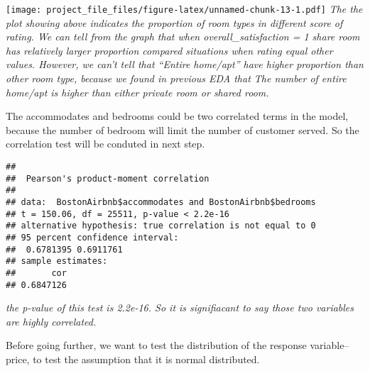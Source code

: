 \documentclass[]{article}
\newenvironment{Shaded}{\begin{snugshade}}{\end{snugshade}}
\newcommand{\KeywordTok}[1]{\textcolor[rgb]{0.13,0.29,0.53}{\textbf{#1}}}
\newcommand{\DataTypeTok}[1]{\textcolor[rgb]{0.13,0.29,0.53}{#1}}
\newcommand{\DecValTok}[1]{\textcolor[rgb]{0.00,0.00,0.81}{#1}}
\newcommand{\StringTok}[1]{\textcolor[rgb]{0.31,0.60,0.02}{#1}}
\newcommand{\CommentTok}[1]{\textcolor[rgb]{0.56,0.35,0.01}{\textit{#1}}}
\newcommand{\OperatorTok}[1]{\textcolor[rgb]{0.81,0.36,0.00}{\textbf{#1}}}
\newcommand{\NormalTok}[1]{#1}
\begin{document}
\texttt{[image: project\_file\_files/figure-latex/unnamed-chunk-13-1.pdf]}
\emph{The the plot showing above indicates the proportion of room types
in different score of rating. We can tell from the graph that when
overall\_satisfaction = 1 share room has relatively larger proportion
compared situations when rating equal other values. However, we can't
tell that ``Entire home/apt'' have higher proportion than other room
type, because we found in previous EDA that The number of entire
home/apt is higher than either private room or shared room.}

The accommodates and bedrooms could be two correlated terms in the
model, because the number of bedroom will limit the number of customer
served. So the correlation test will be conduted in next step.

\begin{Shaded}
\end{Shaded}

\begin{verbatim}
## 
##  Pearson's product-moment correlation
## 
## data:  BostonAirbnb$accommodates and BostonAirbnb$bedrooms
## t = 150.06, df = 25511, p-value < 2.2e-16
## alternative hypothesis: true correlation is not equal to 0
## 95 percent confidence interval:
##  0.6781395 0.6911761
## sample estimates:
##       cor 
## 0.6847126
\end{verbatim}

\emph{the p-value of this test is 2.2e-16. So it is signifiacant to say
those two variables are highly correlated.}

Before going further, we want to test the distribution of the response
variable--price, to test the assumption that it is normal distributed.

\begin{Shaded}
\end{Shaded}
\end{document}
